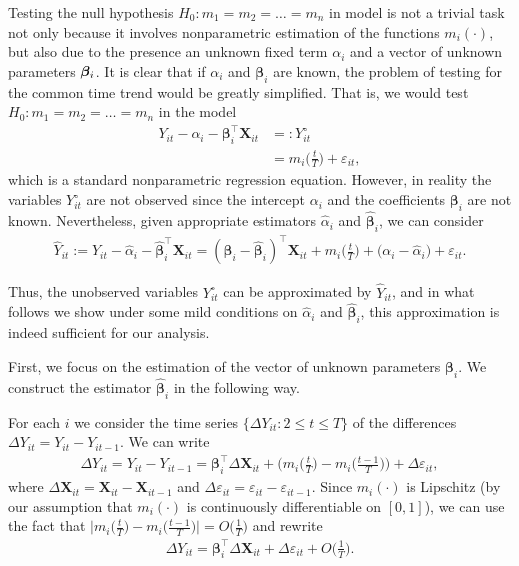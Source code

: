 \documentclass[a4paper,12pt]{article}
\makeatletter
\renewcommand{\eqref}[1]{\tagform@{\ref{#1}}}
\makeatother
\begin{document}
Testing the null hypothesis $H_0: m_1 = m_2 = \ldots = m_n$ in model \eqref{eq:model_full} is not a trivial task not only because it involves nonparametric estimation of the functions $m_i(\cdot)$, but also due to the presence an unknown fixed term $\alpha_i$ and a vector of unknown parameters $\bm{\beta}_i$. It is clear that if $\alpha_i$ and $\bm{\beta}_i$ are known, the problem of testing for the common time trend would be greatly simplified. That is, we would test $H_0: m_1 = m_2 = \ldots = m_n$ in the model
\begin{align*}
Y_{it} - \alpha_i - \bm{\beta}_i^\top \mathbf{X}_{it} & =: Y_{it}^\circ\\
					& = m_i \Big( \frac{t}{T} \Big) + \varepsilon_{it}, 
\end{align*}
which is a standard nonparametric regression equation. However, in reality the variables $Y_{it}^\circ$ are not observed since the intercept $\alpha_i$ and the coefficients $\bm{\beta}_i$ are not known. Nevertheless, given appropriate estimators $\widehat{\alpha}_i$ and $\widehat{\bm{\beta}}_i$, we can consider
\begin{align*}
	\widehat{Y}_{it} := Y_{it} -\widehat{\alpha}_i - \widehat{\bm{\beta}}_i^\top \mathbf{X}_{it} =(\bm{\beta}_i - \widehat{\bm{\beta}}_i)^\top \mathbf{X}_{it} + m_i \Big( \frac{t}{T} \Big) + \big( \alpha_i - \widehat{\alpha}_i \big) + \varepsilon_{it}. 
\end{align*}

Thus, the unobserved variables $Y_{it}^\circ$ can be approximated by $\widehat{Y}_{it}$, and in what follows we show under some mild conditions on $\widehat{\alpha}_i$ and $\widehat{\bm{\beta}}_i$, this approximation is indeed sufficient for our analysis. %

First, we focus on the estimation of the vector of unknown parameters $\bm{\beta}_i$. We construct the estimator  $\widehat{\bm{\beta}}_i$ in the following way.

For each $i$ we consider the time series $\{\Delta Y_{it}: 2 \leq t \leq T\}$ of the differences \linebreak $\Delta Y_{it} = Y_{it} - Y_{i t-1}$. We can write
\begin{align*}
	\Delta Y_{it} = Y_{it} - Y_{i t-1} =\bm{\beta}_i^\top \Delta \mathbf{X}_{it} + \bigg(m_i \Big( \frac{t}{T} \Big) - m_i \Big(\frac{t-1}{T}\Big)\bigg) + \Delta \varepsilon_{it},
\end{align*}
where $\Delta  \mathbf{X}_{it} =  \mathbf{X}_{it} -  \mathbf{X}_{it-1}$ and $ \Delta \varepsilon_{it} = \varepsilon_{it} - \varepsilon_{i t-1}$. Since $m_i(\cdot)$ is Lipschitz (by our assumption that $m_i(\cdot)$ is continuously differentiable on $[0, 1]$), we can use the fact that $ \big|m_i \big( \frac{t}{T} \big) - m_i \big(\frac{t-1}{T}\big) \big| = O\big(\frac{1}{T}\big)$ and rewrite 
\begin{align}\label{model_with_regs}
	\Delta Y_{it} = \bm{\beta}_i^\top \Delta \mathbf{X}_{it} + \Delta \varepsilon_{it} + O\Big(\frac{1}{T}\Big).
\end{align}
\end{document}
